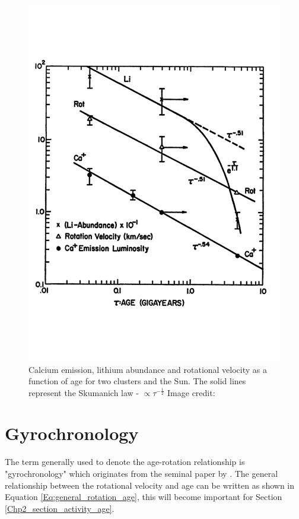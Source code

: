 \begin{figure}
    \centering
    \includegraphics[scale=0.45]{Figures/2-Historical_overview/skumanich_1972.pdf}
    \caption[First plot of age-activity-rotation relationship]{Calcium emission, lithium abundance and rotational velocity as a function of age for two clusters and the Sun. The solid lines represent the Skumanich law - $\propto \tau^{-\frac{1}{2}}$ Image credit: \citet{Skumanich_1972}}
    \label{fig:Skumanich_plot}
\end{figure}

\section{Gyrochronology}
The term generally used to denote the age-rotation relationship is "gyrochronology" which originates from the seminal paper by \citet{Barnes_2003}. The general relationship between the rotational velocity and age can be written as shown in Equation \ref{Eq:general_rotation_age}, this will become important for Section \ref{Chp2_section_activity_age}.

